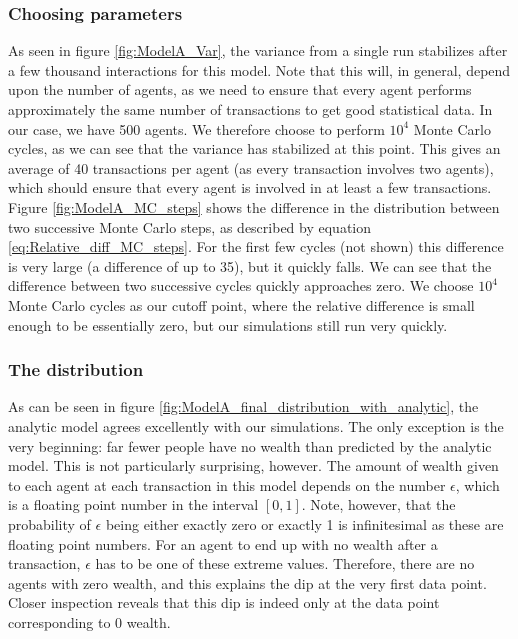 \documentclass[a4paper, 10pt]{article}
\begin{document}
\subsubsection{Choosing parameters}
As seen in figure \ref{fig:ModelA_Var}, the variance from a single run stabilizes after a few thousand interactions for this model. Note that this will, in general, depend upon the number of agents, as we need to ensure that every agent performs approximately the same number of transactions to get good statistical data. In our case, we have 500 agents. We therefore choose to perform $10^4$ Monte Carlo cycles, as we can see that the variance has stabilized at this point. This gives an average of 40 transactions per agent (as every transaction involves two agents), which should ensure that every agent is involved in at least a few transactions.\\
\linebreak
Figure \ref{fig:ModelA_MC_steps} shows the difference in the distribution between two successive Monte Carlo steps, as described by equation \ref{eq:Relative_diff_MC_steps}. For the first few cycles (not shown) this difference is very large (a difference of up to 35), but it quickly falls. We can see that the difference between two successive cycles quickly approaches zero. We choose $10^4$ Monte Carlo cycles as our cutoff point, where the relative difference is small enough to be essentially zero, but our simulations still run very quickly.
\subsubsection{The distribution}
As can be seen in figure \ref{fig:ModelA_final_distribution_with_analytic}, the analytic model agrees excellently with our simulations. The only exception is the very beginning: far fewer people have no wealth than predicted by the analytic model. This is not particularly surprising, however. The amount of wealth given to each agent at each transaction in this model depends on the number $\epsilon$, which is a floating point number in the interval $[0,1]$. Note, however, that the probability of $\epsilon$ being either exactly zero or exactly 1 is infinitesimal as these are floating point numbers. For an agent to end up with no wealth after a transaction, $\epsilon$ has to be one of these extreme values. Therefore, there are no agents with zero wealth, and this explains the dip at the very first data point. Closer inspection reveals that this dip is indeed only at the data point corresponding to 0 wealth.
\end{document}
